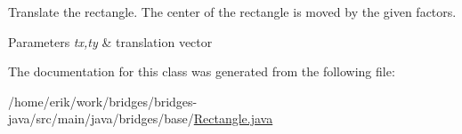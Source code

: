 Translate the rectangle. The center of the rectangle is moved by the given factors.


\begin{DoxyParams}{Parameters}
{\em tx,ty} & translation vector \\
\hline
\end{DoxyParams}


The documentation for this class was generated from the following file\+:\begin{DoxyCompactItemize}
\item 
/home/erik/work/bridges/bridges-\/java/src/main/java/bridges/base/\hyperlink{_rectangle_8java}{Rectangle.\+java}\end{DoxyCompactItemize}
